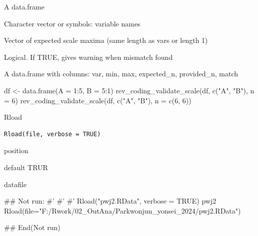 \documentclass[a4paper]{book}
\begin{document}
%
\begin{Arguments}
\begin{ldescription}
\item[\code{data}] A data.frame

\item[\code{vars}] Character vector or symbols: variable names

\item[\code{n}] Vector of expected scale maxima (same length as vars or length 1)

\item[\code{strict}] Logical. If TRUE, gives warning when mismatch found
\end{ldescription}
\end{Arguments}
%
\begin{Value}
A data.frame with columns: var, min, max, expected\_n, provided\_n, match
\end{Value}
%
\begin{Examples}
\begin{ExampleCode}
df <- data.frame(A = 1:5, B = 5:1)
rev_coding_validate_scale(df, c("A", "B"), n = 6)
rev_coding_validate_scale(df, c("A", "B"), n = c(6, 6))
\end{ExampleCode}
\end{Examples}
%
\begin{Description}
Rload
\end{Description}
%
\begin{Usage}
\begin{verbatim}
Rload(file, verbose = TRUE)
\end{verbatim}
\end{Usage}
%
\begin{Arguments}
\begin{ldescription}
\item[\code{file}] position

\item[\code{verbose}] default TRUR
\end{ldescription}
\end{Arguments}
%
\begin{Value}
datafile
\end{Value}
%
\begin{Examples}
\begin{ExampleCode}

\#\# Not run: 
#'
#'
#'
Rload("pwj2.RData", verbose = TRUE)
pwj2 %
Rload(file="F:/Rwork/02_OutAna/Parkwonjun_yonsei_2024/pwj2.RData")

## End(Not run)


\end{ExampleCode}
\end{Examples}
\end{document}
